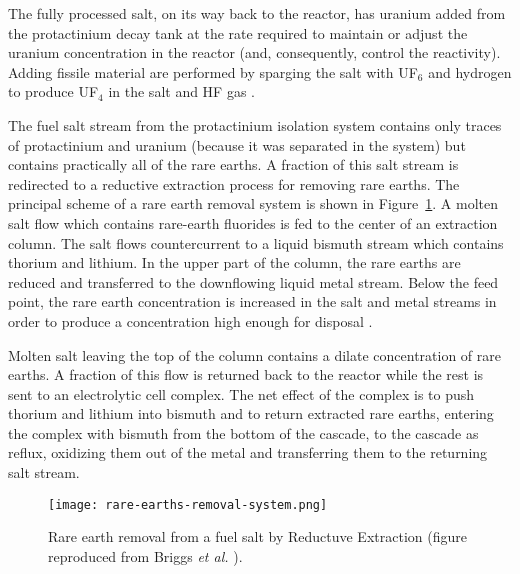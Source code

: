 The fully processed salt, on its way back to the reactor, has uranium added from the protactinium decay tank at the rate required to maintain or adjust the uranium concentration in the reactor (and, consequently, control the reactivity). Adding fissile material are performed by sparging the salt with UF$_6$ and hydrogen to produce UF$_4$ in the salt and HF gas \cite{robertson_conceptual_1971}.

The fuel salt stream from the protactinium isolation system contains only traces of protactinium and uranium (because it was separated in the system) but contains practically all of the rare earths. A fraction of this salt stream is redirected to a reductive extraction process for removing rare earths.  The principal scheme of a rare earth removal system is shown in Figure~\ref{fig:rare-earth-removal}. A molten salt flow which contains rare-earth fluorides is fed to the center of an extraction column. The salt flows countercurrent to a liquid bismuth stream which contains thorium and lithium. In the upper part of the column, the rare earths are reduced and transferred to the downflowing liquid metal stream. Below the feed point, the rare earth concentration is increased in the salt and metal streams in order to produce a concentration high enough for disposal \cite{briggs_molten-salt_1969}.

Molten salt leaving the top of the column contains a dilate concentration of rare earths. A fraction of this flow is returned back to the reactor while the rest is sent to an electrolytic cell complex. The net effect of the complex is to push thorium and lithium into bismuth and to return extracted rare earths, entering the complex with bismuth from the bottom of the cascade, to the cascade as reflux, oxidizing them out of the metal and transferring them to the returning salt stream.
\begin{figure}[htbp!]
  \centering
        \texttt{[image: rare-earths-removal-system.png]}
    \caption{Rare earth removal from a fuel salt by Reductuve Extraction (figure 
    reproduced from Briggs \emph{et al.} \cite{briggs_molten-salt_1969}).}
    \label{fig:rare-earth-removal}
\end{figure}

